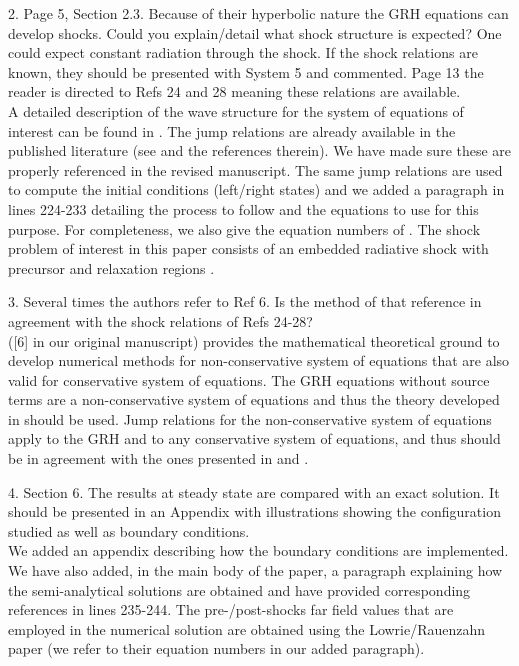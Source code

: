 \documentclass{article}
\begin{document}
{\color{blue}
2. Page 5, Section 2.3. Because of their hyperbolic nature the GRH equations can develop shocks.
Could you explain/detail what shock structure is expected? One could expect constant radiation through the shock.
If the shock relations are known, they should be presented with System 5 and commented. Page 13 the reader is directed to Refs 24 and 28 meaning these relations are available.\\}
A detailed description of the wave structure for the system of equations of interest can be found in \cite{Balsara}. The jump relations are already  available in the published literature (see \cite{LowrieEdwards, LowrieMorelHittinger} and the references therein). We have made sure these
are properly referenced in the revised manuscript. The same jump relations are used to compute the initial conditions (left/right states) and we added a paragraph in lines 224-233 detailing the process to follow and the equations to use for this purpose.  For completeness, we also give the equation numbers of \cite{LowrieEdwards}. The shock problem of interest in this paper consists of an embedded radiative shock with precursor and relaxation regions \cite{LowrieEdwards}.
\bigskip

{\color{blue}
3. Several times the authors refer to Ref 6. Is the method of that reference in agreement with the shock relations of Refs 24-28?
\\}
\cite{dlm} ([6] in our original manuscript) provides the mathematical theoretical ground to develop numerical methods for non-conservative system of equations that are also valid for conservative system of equations. The GRH equations without source terms are a non-conservative system of equations and thus the theory developed in \cite{dlm} should be used. Jump relations for the non-conservative system of equations apply to the GRH and to any conservative system of equations, and thus should be in agreement with the ones presented in \cite{LowrieEdwards} and \cite{Toro}.
\bigskip

{\color{blue}
4. Section 6. The results at steady state are compared with an exact solution. It should be presented in an Appendix with illustrations showing the configuration studied as well as boundary conditions. \\}
We added an appendix describing how the boundary conditions are implemented. We have also added, in the main body of the paper, a paragraph explaining how the semi-analytical solutions are obtained and have provided corresponding references in lines 235-244. The pre-/post-shocks far field values that are employed in the numerical solution are obtained using the Lowrie/Rauenzahn paper \cite{LowrieRauenzahn} (we refer to their equation numbers in our added paragraph).
\end{document}
